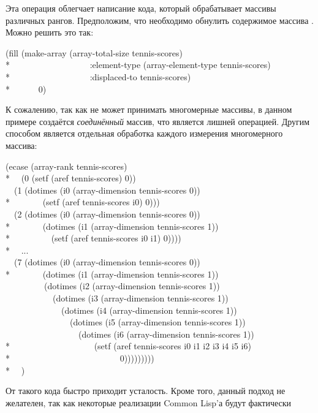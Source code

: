 \begin{defun}[Функция]
Эта операция облегчает написание кода, который обрабатывает массивы различных
рангов. Предположим, что необходимо обнулить содержимое массива
. Можно решить это так:
\begin{lisp}
(fill (make-array (array-total-size tennis-scores) \\*
~~~~~~~~~~~~~~~~~~:element-type (array-element-type tennis-scores) \\*
~~~~~~~~~~~~~~~~~~:displaced-to tennis-scores) \\*
~~~~~~0)
\end{lisp}
К сожалению, так как  не может принимать многомерные массивы, в данном
примере создаётся \emph{соединённый} массив, что является лишней операцией.
Другим способом является отдельная обработка каждого измерения многомерного
массива:
\begin{lisp}
(ecase (array-rank tennis-scores) \\*
~~(0 (setf (aref tennis-scores) 0)) \\
~~(1 (dotimes (i0 (array-dimension tennis-scores 0)) \\*
~~~~~~~(setf (aref tennis-scores i0) 0))) \\
~~(2 (dotimes (i0 (array-dimension tennis-scores 0)) \\*
~~~~~~~(dotimes (i1 (array-dimension tennis-scores 1)) \\*
~~~~~~~~~(setf (aref tennis-scores i0 i1) 0)))) \\*
~~... \\
~~(7 (dotimes (i0 (array-dimension tennis-scores 0)) \\*
~~~~~~~(dotimes (i1 (array-dimension tennis-scores 1)) \\
~~~~~~~~~(dotimes (i2 (array-dimension tennis-scores 1)) \\
~~~~~~~~~~~(dotimes (i3 (array-dimension tennis-scores 1)) \\
~~~~~~~~~~~~~(dotimes (i4 (array-dimension tennis-scores 1)) \\
~~~~~~~~~~~~~~~(dotimes (i5 (array-dimension tennis-scores 1)) \\
~~~~~~~~~~~~~~~~~(dotimes (i6 (array-dimension tennis-scores 1)) \\*
~~~~~~~~~~~~~~~~~~~(setf (aref tennis-scores i0 i1 i2 i3 i4 i5 i6) \\*
~~~~~~~~~~~~~~~~~~~~~~~~~0))))))))) \\*
~~)
\end{lisp}
От такого кода быстро приходит усталость. Кроме того, данный подход не
желателен, так как некоторые реализации Common Lisp'а будут фактически

\end{defun}
